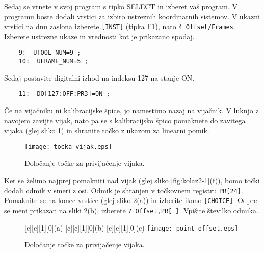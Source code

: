 Sedaj se vrnete v svoj program s tipko SELECT in izberet vaš program. V programu boste dodali vrstici za izbiro ustreznih koordinatnih sistemov. V ukazni vrstici na dnu zaslona izberete \verb|[INST]| (tipka F1), nato \verb*|4 Offset/Frames|. Izberete ustrezne ukaze in vrednosti kot je prikazano spodaj.

\vspace{0.35cm}
\begin{mdframed}[backgroundcolor=orange!20, shadow=true,roundcorner=8pt]
	
	\begin{verbatim}
	9:  UTOOL_NUM=9 ;
	10:  UFRAME_NUM=5 ;
	\end{verbatim}
	
\end{mdframed}

Sedaj postavite digitalni izhod na indeksu 127 na stanje ON.

\vspace{0.35cm}
\begin{mdframed}[backgroundcolor=orange!20, shadow=true,roundcorner=8pt]
	
	\begin{verbatim}
	11:  DO[127:OFF:PR3]=ON ;
	\end{verbatim}
	
\end{mdframed}

Če na vijačniku ni kalibracijske špice, jo namestimo nazaj na vijačnik. V luknjo z navojem zavijte vijak, nato pa se s kalibracijsko špico pomaknete do zavitega vijaka (glej sliko \ref{fig:tocka_vijak}) in shranite točko z ukazom za linearni pomik. 

\begin{figure}[!hbt]
	\centering
	\texttt{[image: tocka\_vijak.eps]}
	\caption{Določanje točke za privijačenje vijaka.}
	\label{fig:tocka_vijak}
\end{figure}

Ker se želimo najprej pomakniti nad vijak (glej sliko \ref{fig:kolaz2-1}(f)), bomo točki dodali odmik v smeri z osi. Odmik je shranjen v točkovnem registru \verb*|PR[24]|. Pomaknite se na konec vrstice (glej sliko \ref{fig:point_offset}(a)) in izberite ikono \verb*|[CHOICE]|. Odpre se meni prikazan na sliki \ref{fig:point_offset}(b), izberete \verb*|7 Offset,PR[ ]|. Vpišite številko odmika.

\begin{figure}[!hbt]
	\centering
	[c][1][0]{(a)}
	[c][1][0]{(b)}		
	[c][1][0]{(c)}	
	\texttt{[image: point\_offset.eps]}
	\caption{Določanje točke za privijačenje vijaka.}
	\label{fig:point_offset}
\end{figure}

